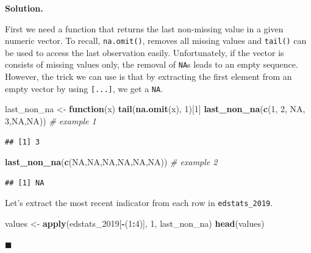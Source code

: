 \documentclass[10pt,b5paper,krantz1]{krantz}
\newenvironment{Shaded}{\begin{snugshade}}{\end{snugshade}}
\newcommand{\CommentTok}[1]{\textcolor[rgb]{0.37,0.37,0.37}{\textit{#1}}}
\newcommand{\ControlFlowTok}[1]{\textcolor[rgb]{0.27,0.27,0.27}{\textbf{#1}}}
\newcommand{\DecValTok}[1]{\textcolor[rgb]{0.06,0.06,0.06}{#1}}
\newcommand{\KeywordTok}[1]{\textcolor[rgb]{0.27,0.27,0.27}{\textbf{#1}}}
\newcommand{\NormalTok}[1]{#1}
\newcommand{\OperatorTok}[1]{\textcolor[rgb]{0.43,0.43,0.43}{\textbf{#1}}}
\newcommand{\OtherTok}[1]{\textcolor[rgb]{0.37,0.37,0.37}{#1}}
\newcommand{\StringTok}[1]{\textcolor[rgb]{0.5,0.5,0.5}{#1}}
\newenvironment{solution}{%
\bigskip\noindent\textbf{Solution. }%
\it\ignorespaces%
\ignorespaces%
}{\ignorespaces%
\hfill$\blacksquare$%
}
\begin{document}
\begin{solution}

First we need a function that returns the last non-missing value in a
given numeric vector.
To recall, \texttt{na.omit()}, removes all missing values and \texttt{tail()} can be
used to access the last observation easily. Unfortunately, if the vector
is consists of missing values only, the removal of \texttt{NA}s leads
to an empty sequence. However, the trick we can use is that
by extracting the first element from an empty vector by using
\texttt{{[}...{]}}, we get a \texttt{NA}.

\begin{Shaded}
\begin{Highlighting}[]
\NormalTok{last_non_na <-}\StringTok{ }\ControlFlowTok{function}\NormalTok{(x) }\KeywordTok{tail}\NormalTok{(}\KeywordTok{na.omit}\NormalTok{(x), }\DecValTok{1}\NormalTok{)[}\DecValTok{1}\NormalTok{]}
\KeywordTok{last_non_na}\NormalTok{(}\KeywordTok{c}\NormalTok{(}\DecValTok{1}\NormalTok{, }\DecValTok{2}\NormalTok{, }\OtherTok{NA}\NormalTok{, }\DecValTok{3}\NormalTok{,}\OtherTok{NA}\NormalTok{,}\OtherTok{NA}\NormalTok{)) }\CommentTok{# example 1}
\end{Highlighting}
\end{Shaded}

\begin{verbatim}
## [1] 3
\end{verbatim}

\begin{Shaded}
\begin{Highlighting}[]
\KeywordTok{last_non_na}\NormalTok{(}\KeywordTok{c}\NormalTok{(}\OtherTok{NA}\NormalTok{,}\OtherTok{NA}\NormalTok{,}\OtherTok{NA}\NormalTok{,}\OtherTok{NA}\NormalTok{,}\OtherTok{NA}\NormalTok{,}\OtherTok{NA}\NormalTok{)) }\CommentTok{# example 2}
\end{Highlighting}
\end{Shaded}

\begin{verbatim}
## [1] NA
\end{verbatim}

Let's extract the most recent indicator from each row in \texttt{edstats\_2019}.

\begin{Shaded}
\begin{Highlighting}[]
\NormalTok{values <-}\StringTok{ }\KeywordTok{apply}\NormalTok{(edstats_}\DecValTok{2019}\NormalTok{[}\OperatorTok{-}\NormalTok{(}\DecValTok{1}\OperatorTok{:}\DecValTok{4}\NormalTok{)], }\DecValTok{1}\NormalTok{, last_non_na)}
\KeywordTok{head}\NormalTok{(values)}
\end{Highlighting}
\end{Shaded}


\end{solution}
\end{document}
